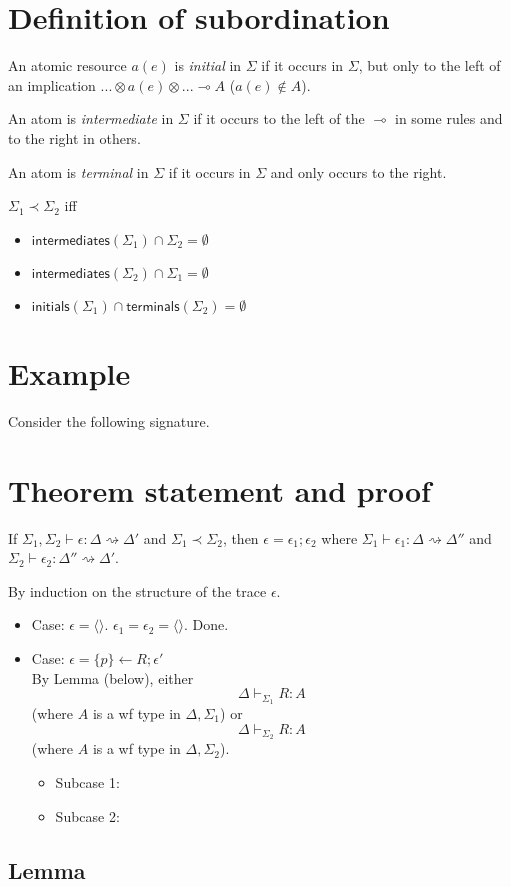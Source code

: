 \documentclass{article}
\newcommand{\lolli}{\multimap}
\newcommand{\tensor}{\otimes}
\newcommand{\subord}{\prec}
\newcommand{\inits}{\mathsf{initials}}
\newcommand{\interms}{\mathsf{intermediates}}
\newcommand{\terms}{\mathsf{terminals}}
\newcommand{\eps}{\epsilon}
\newcommand{\stepsto}{\rightsquigarrow}
\newcommand{\nileps}{\langle\rangle}
\begin{document}
\section{Definition of subordination}

An atomic resource $a(e)$ is {\em initial} in $\Sigma$ if it occurs in
$\Sigma$, but only to the left of an implication 
$... \tensor a(e) \tensor ... \lolli {A}$ ($a(e) \notin A$).

An atom is {\em intermediate} in $\Sigma$ if it occurs to the left of
the $\lolli$ in some rules and to the right in others.

An atom is {\em terminal} in $\Sigma$ if it occurs in $\Sigma$ and only
occurs to the right.

$\Sigma_1 \subord \Sigma_2$ iff

\begin{itemize}
\item $\interms(\Sigma_1) \cap \Sigma_2 = \emptyset$
\item $\interms(\Sigma_2) \cap \Sigma_1 = \emptyset$
\item $\inits(\Sigma_1) \cap \terms(\Sigma_2) = \emptyset$
\end{itemize}



\section{Example}

Consider the following signature.



\section{Theorem statement and proof}

If $\Sigma_1, \Sigma_2 \vdash \eps : \Delta \stepsto \Delta'$
and $\Sigma_1 \subord \Sigma_2$, then
$\eps = \eps_1 ; \eps_2$ where
$\Sigma_1 \vdash \eps_1 : \Delta \stepsto \Delta''$
and
$\Sigma_2 \vdash \eps_2 : \Delta'' \stepsto \Delta'$.

By induction on the structure of the trace $\eps$.

\begin{itemize}
\item Case: $\eps = \nileps$. $\eps_1 = \eps_2 = \nileps$. Done.
\item Case: $\eps = \{p\}\gets R; \eps'$\\
  By Lemma (below), either 
  \[ \Delta \vdash_{\Sigma_1} R : A \]
    (where $A$ is a wf type in $\Delta, \Sigma_1$)
  or
  \[ \Delta \vdash_{\Sigma_2} R : A \]
    (where $A$ is a wf type in $\Delta, \Sigma_2$).\\
  \begin{itemize}
  \item Subcase 1:
  \item Subcase 2:
  \end{itemize}
\end{itemize}

\subsection{Lemma}

% 
% 
\end{document}

